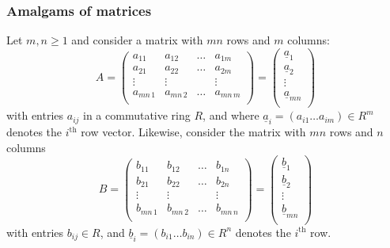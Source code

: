 \documentclass[a4paper,10pt]{amsart}
\theoremstyle{definition}
\theoremstyle{remark}
\numberwithin{equation}{section}
\newcommand{\0}{\color{blue}{\mathsf{0}}}
\begin{document}
  \subsubsection{Amalgams of  matrices}
    Let $m,n\geq 1$ and consider a  matrix with $mn$ rows and $m$ columns:
\begin{equation} \label{matrixAdef} A=   \begin{pmatrix}  a_{11} & a_{12} &  \ldots & a_{1m} \\ 
a_{21} & a_{22} &  \ldots & a_{2m} \\ 
 \vdots    &   \vdots&  & \vdots \\
a_{mn\, 1 } & a_{mn \, 2} &  \ldots & a_{mn \, m} \\ 
 \end{pmatrix}  = 
 \begin{pmatrix}  \underline{a}_1 \\ 
 \underline{a}_2 \\ 
      \vdots \\
\underline{a}_{mn} \\ 
 \end{pmatrix}    
 \end{equation} 
 with entries $a_{i  j}$ in a commutative ring $R$, and where $\underline{a}_i = (a_{i 1} \ldots a_{i  m} ) \in R^m$ denotes the $i^{\mathrm{th}}$ row vector.
 Likewise, consider the matrix with  $mn$ rows and $n$ columns 
\begin{equation} \label{matrixBdef}    B=   \begin{pmatrix}  b_{11} & b_{12} &  \ldots & b_{1 n } \\ 
b_{21} & b_{22} &  \ldots & b_{2 n } \\ 
 \vdots    &  \vdots &  & \vdots \\
b_{mn\, 1 } & b_{mn \, 2} &  \ldots & b_{mn \,  n } \\ 
 \end{pmatrix} =  \begin{pmatrix}   \underline{b}_1 \\ 
 \underline{b}_2 \\ 
      \vdots \\
\underline{b}_{mn} \\ 
 \end{pmatrix}     \end{equation}
 with entries $b_{ij}\in R$, and  $\underline{b}_i = (b_{i  1} \ldots b_{i  n} ) \in R^n$ denotes the $i^{\mathrm{th}}$ row.
  
\end{document}
